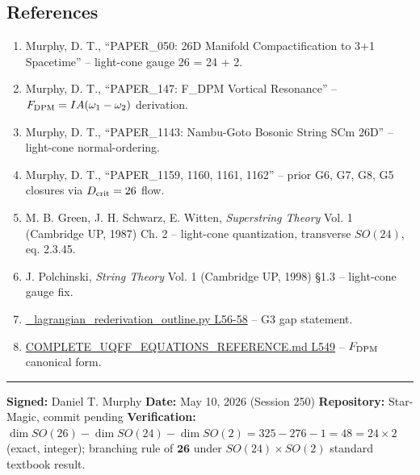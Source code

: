 \documentclass[
]{article}
\providecommand{\tightlist}{%
  \setlength{\itemsep}{0pt}\setlength{\parskip}{0pt}}
\begin{document}
\subsection{References}\label{references}

\begin{enumerate}
\def\labelenumi{\arabic{enumi}.}
\tightlist
\item
  Murphy, D. T., ``PAPER\_050: 26D Manifold Compactification to 3+1
  Spacetime'' -- light-cone gauge 26 = 24 + 2.
\item
  Murphy, D. T., ``PAPER\_147: F\_DPM Vortical Resonance'' --
  \(F_{\rm DPM} = IA(\omega_1-\omega_2)\) derivation.
\item
  Murphy, D. T., ``PAPER\_1143: Nambu-Goto Bosonic String SCm 26D'' --
  light-cone normal-ordering.
\item
  Murphy, D. T., ``PAPER\_1159, 1160, 1161, 1162'' -- prior G6, G7, G8,
  G5 closures via \(D_{\rm crit}=26\) flow.
\item
  M. B. Green, J. H. Schwarz, E. Witten, \emph{Superstring Theory} Vol.
  1 (Cambridge UP, 1987) Ch. 2 -- light-cone quantization, transverse
  \(SO(24)\), eq. 2.3.45.
\item
  J. Polchinski, \emph{String Theory} Vol. 1 (Cambridge UP, 1998) §1.3
  -- light-cone gauge fix.
\item
  \href{_lagrangian_rederivation_outline.py\#L56}{\_lagrangian\_rederivation\_outline.py
  L56-58} -- G3 gap statement.
\item
  \href{COMPLETE_UQFF_EQUATIONS_REFERENCE.md\#L549}{COMPLETE\_UQFF\_EQUATIONS\_REFERENCE.md
  L549} -- \(F_{\rm DPM}\) canonical form.
\end{enumerate}

\begin{center}\rule{0.5\linewidth}{0.5pt}\end{center}

\textbf{Signed:} Daniel T. Murphy \textbf{Date:} May 10, 2026 (Session
250) \textbf{Repository:} Star-Magic, commit pending
\textbf{Verification:}
\(\dim SO(26) - \dim SO(24) - \dim SO(2) = 325 - 276 - 1 = 48 = 24\times 2\)
(exact, integer); branching rule of \(\mathbf{26}\) under
\(SO(24)\times SO(2)\) standard textbook result.




\end{document}
